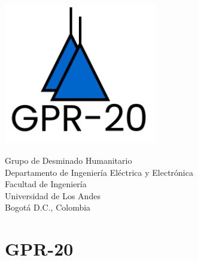
\begin{titlepage}
    \begin{center}
        
        \vspace*{2cm}
        
        \includegraphics[width=0.5\textwidth]{images/logo.pdf}
        
        \vspace{3cm}
        
        \begin{huge}
            \textbf{\GPRManualName}
        \end{huge}
        
        \vfill
        
        \begin{singlespace}
            Grupo de Desminado Humanitario \\
            Departamento de Ingeniería Eléctrica y Electrónica \\
            Facultad de Ingeniería \\
            Universidad de Los Andes \\
            Bogotá D.C., Colombia       
        \end{singlespace}
    \end{center}
\end{titlepage}



\section*{GPR-20 \GPRManualName}
